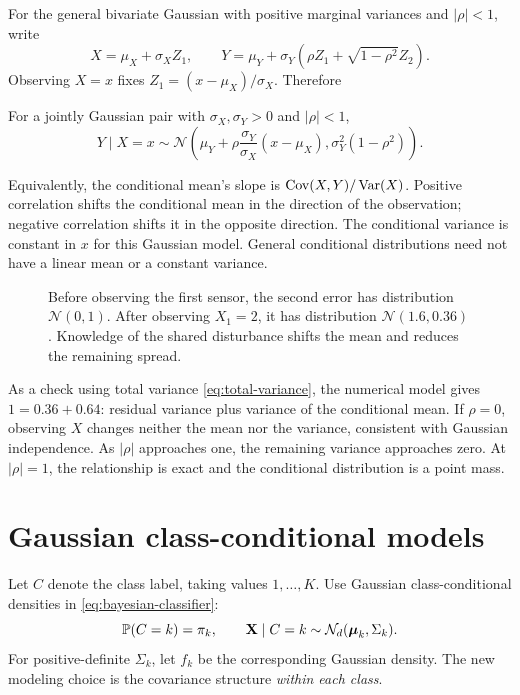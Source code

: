 For the general bivariate Gaussian with positive marginal variances and
\(|\rho|<1\), write
\[
  X=\mu_X+\sigma_X Z_1,\qquad
  Y=\mu_Y+\sigma_Y(\rho Z_1+\sqrt{1-\rho^2}Z_2).
\]
Observing \(X=x\) fixes \(Z_1=(x-\mu_X)/\sigma_X\). Therefore
\begin{result}
For a jointly Gaussian pair with \(\sigma_X,\sigma_Y>0\) and \(|\rho|<1\),
\begin{equation}
  Y\mid X=x\sim\mathcal N\!\left(
    \mu_Y+\rho\frac{\sigma_Y}{\sigma_X}(x-\mu_X),
    \sigma_Y^2(1-\rho^2)\right).
  \label{eq:conditional-bivariate-gaussian}
\end{equation}
\end{result}
Equivalently, the conditional mean's slope is
\(\operatorname{Cov}(X,Y)/\operatorname{Var}(X)\). Positive correlation shifts the conditional
mean in the direction of the observation; negative correlation shifts
it in the opposite direction. The conditional variance is constant in
\(x\) for this Gaussian model. General conditional distributions need
not have a linear mean or a constant variance.

\begin{figure}[H]
  \centering
  
  \caption{Before observing the first sensor, the second error has
  distribution \(\mathcal N(0,1)\). After observing \(X_1=2\), it has
  distribution \(\mathcal N(1.6,0.36)\). Knowledge of the shared
  disturbance shifts the mean and reduces the remaining spread.}
  \label{fig:gaussian-conditional-density}
\end{figure}

As a check using total variance \eqref{eq:total-variance}, the numerical
model gives \(1=0.36+0.64\): residual variance plus variance of the
conditional mean. If \(\rho=0\), observing
\(X\) changes neither the mean nor the variance, consistent with
Gaussian independence. As \(|\rho|\) approaches one, the remaining
variance approaches zero. At \(|\rho|=1\), the relationship is exact
and the conditional distribution is a point mass.

\section{Gaussian class-conditional models}
\label{sec:gaussian-classification}

Let \(C\) denote the class label, taking values \(1,\ldots,K\). Use
Gaussian class-conditional densities in \eqref{eq:bayesian-classifier}:
\[
  \mathbb{P}(C=k)=\pi_k,\qquad
  \mathbf X\mid C=k\sim\mathcal N_d(\boldsymbol\mu_k,\Sigma_k).
\]
For positive-definite \(\Sigma_k\), let \(f_k\) be the corresponding
Gaussian density. The new modeling choice is the covariance structure
\emph{within each class}.

